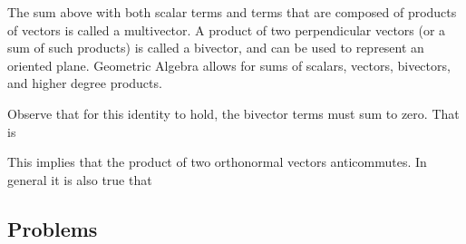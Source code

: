 The sum above with both scalar terms and terms that are composed of products of vectors is called a multivector.
A product of two perpendicular vectors (or a sum of such products) is called a bivector, and can be used to represent an oriented plane.
Geometric Algebra allows for sums of scalars, vectors, bivectors, and higher degree products.

Observe that for this identity to hold, the bivector terms must sum to zero.  That is


This implies that the product of two orthonormal vectors anticommutes.  In general it is also true that


%


\subsection{Problems}

